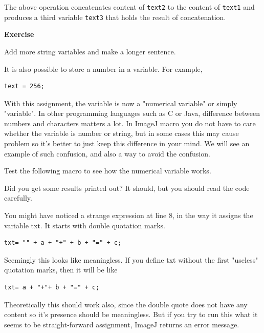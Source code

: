 \documentclass[11pt,a4paper,oneside]{report}
\newenvironment{indentexercise}[1]%
{{\setlength{\leftmargin}{2em}}%
\textbf{Exercise \thesubsection-#1}%
\begin{list}{}%
	\item%
}
{\end{list}}
\newcommand{\ilcom}[1]{\texttt{\small#1}}
\begin{document}


The above operation concatenates content of \ilcom{text2} to the content of \ilcom{text1} and produces a third variable \ilcom{text3} that holds the result of concatenation. 

\begin{indentexercise}{1}
\item Add more string variables and make a longer sentence.\\
\end{indentexercise}


It is also possible to store a number in a variable. For example, \\
\begin{lstlisting}[numbers=none]
text = 256;
\end{lstlisting}
With this assignment, the variable is now a "numerical variable" or simply "variable". 
In other programming languages such as C or Java, difference between numbers and characters matters a lot. 
In ImageJ macro you do not have to care whether the variable is number or string,  but in some cases this may cause problem 
so it's better to just keep this difference in your mind. We will see an example of such confusion, 
and also a way to avoid the confusion. 

Test the following macro to see how the numerical variable works. 

Did you get some results printed out? It should, but you should read the code carefully. 

You might have noticed a strange expression at line 8, in the way it assigns the variable txt. 
It starts with double quotation marks. \\
%
\begin{lstlisting}[numbers=none]
txt= "" + a + "+" + b + "=" + c;
\end{lstlisting}
Seemingly this looks like meaningless. 
If you define txt without the first "useless" quotation marks, then it will be like\\
\begin{lstlisting}[numbers=none]
txt= a + "+"+ b + "=" + c;
\end{lstlisting}
Theoretically this should work also, 
since the double quote does not have any content so it's presence should be meaningless. But if you try to run this what it seems to be straight-forward assignment, 
ImageJ returns an error message. 
\end{document}
